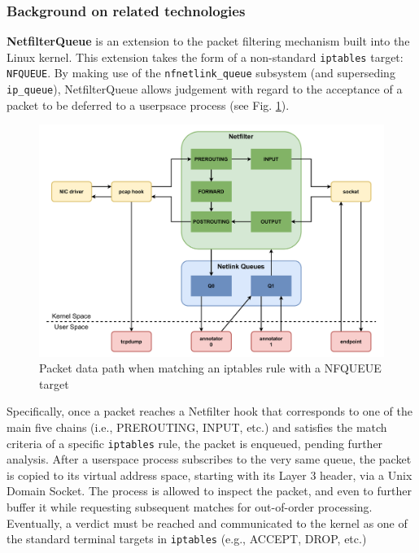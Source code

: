 \subsubsection{Background on related technologies}
\label{extend:ops:architecture:background}

\textbf{NetfilterQueue} is an extension to the packet filtering mechanism built into the Linux kernel. This extension takes the form of a non-standard \texttt{iptables} target: \texttt{NFQUEUE}. By making use of the \texttt{nfnetlink\_queue} subsystem (and superseding \texttt{ip\_queue}), NetfilterQueue allows judgement with regard to the acceptance of a packet to be deferred to a userpsace process (see Fig. \ref{extend:ops:fig:nfq}).

\begin{figure}[htb]
    \centering
    \includegraphics[width=\textwidth,keepaspectratio]{figures/netfilter_queue.pdf}
    \caption{Packet data path when matching an iptables rule with a NFQUEUE target}
    \label{extend:ops:fig:nfq}
\end{figure}

Specifically, once a packet reaches a Netfilter hook that corresponds to one of the main five chains (i.e., PREROUTING, INPUT, etc.) and satisfies the match criteria of a specific \texttt{iptables} rule, the packet is enqueued, pending further analysis. After a userspace process subscribes to the very same queue, the packet is copied to its virtual address space, starting with its Layer 3 header, via a Unix Domain Socket. The process is allowed to inspect the packet, and even to further buffer it while requesting subsequent matches for out-of-order processing. Eventually, a verdict must be reached and communicated to the kernel as one of the standard terminal targets in \texttt{iptables} (e.g., ACCEPT, DROP, etc.)

